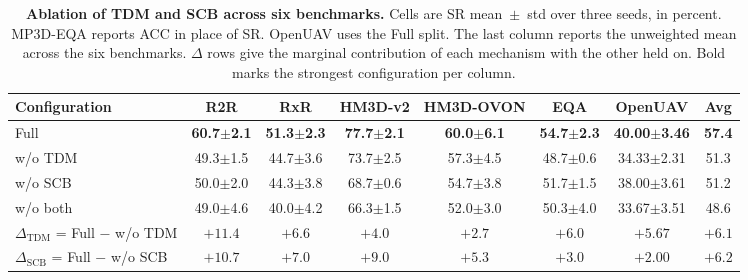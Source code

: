\documentclass[conference]{IEEEtran}
\begin{document}
\begin{table}[!t]
\centering
\caption{\textbf{Ablation of TDM and SCB across six benchmarks.}
Cells are SR mean~$\pm$~std over three seeds, in percent.  MP3D-EQA reports
ACC in place of SR.  OpenUAV uses the Full split.  The last column reports the
unweighted mean across the six benchmarks.  $\Delta$ rows give the marginal
contribution of each mechanism with the other held on.  Bold marks the
strongest configuration per column.}
\label{tab:ablation_mechanisms}
\vspace{-6pt}
{\fontsize{9pt}{11pt}\selectfont
\setlength{\tabcolsep}{4pt}
\begin{tabular}{l|cccccc|c}
\toprule
\textbf{Configuration} &
\textbf{R2R} & \textbf{RxR} &
\textbf{HM3D-v2} & \textbf{HM3D-OVON} &
\textbf{EQA} & \textbf{OpenUAV} & \textbf{Avg} \\
\midrule
Full                            & \textbf{60.7$\pm$2.1} & \textbf{51.3$\pm$2.3} & \textbf{77.7$\pm$2.1} & \textbf{60.0$\pm$6.1} & \textbf{54.7$\pm$2.3} & \textbf{40.00$\pm$3.46} & \textbf{57.4} \\
w/o TDM                         & 49.3$\pm$1.5 & 44.7$\pm$3.6 & 73.7$\pm$2.5 & 57.3$\pm$4.5 & 48.7$\pm$0.6 & 34.33$\pm$2.31 & 51.3 \\
w/o SCB                         & 50.0$\pm$2.0 & 44.3$\pm$3.8 & 68.7$\pm$0.6 & 54.7$\pm$3.8 & 51.7$\pm$1.5 & 38.00$\pm$3.61 & 51.2 \\
w/o both                        & 49.0$\pm$4.6 & 40.0$\pm$4.2 & 66.3$\pm$1.5 & 52.0$\pm$3.0 & 50.3$\pm$4.0 & 33.67$\pm$3.51 & 48.6 \\
\midrule
$\Delta_{\mathrm{TDM}}$ = Full $-$ w/o TDM & $+11.4$ & $+6.6$ & $+4.0$ & $+2.7$ & $+6.0$ & $+5.67$ & $+6.1$ \\
$\Delta_{\mathrm{SCB}}$ = Full $-$ w/o SCB & $+10.7$ & $+7.0$ & $+9.0$ & $+5.3$ & $+3.0$ & $+2.00$ & $+6.2$ \\
\bottomrule
\end{tabular}}
\end{table}
\end{document}
